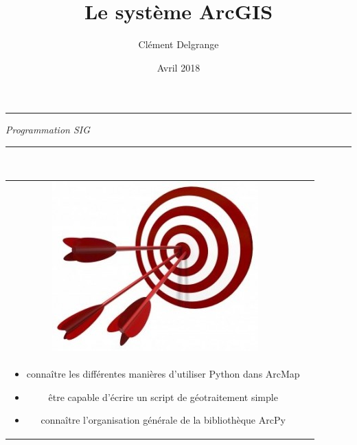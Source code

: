 \documentclass[11pt]{article}
\title{Le système ArcGIS}
\author{Clément Delgrange}
\date{Avril 2018}
\newenvironment{objectifs}{
	\begin{lrbox}{\mybox}
		\begin{minipage}{0.9\textwidth}
			\vspace{1em}
			\begin{tabular}[t t]{c c}
				\includegraphics[width=0.1\linewidth]{img/goals.jpg} &
				\begin{minipage}[c]{0.8\linewidth}
					\hspace{2em}\textbf{\large{Objectifs :}} \\
}{
				\end{minipage}
			\end{tabular}
			\vspace{1em}
		\end{minipage}
	\end{lrbox}
	\fbox{\usebox{\mybox}}
}
\begin{document}
\parindent=0cm


\begin{titlepage}
\makeatletter
	\begin{sffamily}
		\begin{flushleft}
		\end{flushleft}
		\begin{flushright}
		\end{flushright}

		\vspace{4cm}

		\begin{center}
			\hrule
				\vspace{1em}
				{\small \textit{Programmation SIG}}\\
				\vspace{0.5cm}
				{\huge\bfseries \@title}
				\vspace{1cm}
			\hrule

			\vspace{3.5cm}
			\vspace{5cm}

			\large \textit{\@author}\\
			\small \textit{\@date}
		\end{center}
	\end{sffamily}
\makeatother
\end{titlepage}



\begin{objectifs}
\begin{itemize}
	\item connaître les différentes manières d'utiliser Python dans ArcMap
	\item être capable d'écrire un script de géotraitement simple
	\item connaître l'organisation générale de la bibliothèque ArcPy
\end{itemize}
\end{objectifs}


\end{document}
